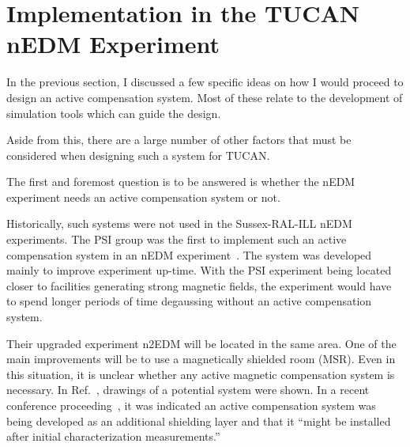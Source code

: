\section{Implementation in the TUCAN nEDM Experiment}\label{sec:implemantation}


In the previous section, I discussed a few specific ideas on how I would proceed to design an active compensation system. Most of these relate to the development of simulation tools which can guide the design.

Aside from this, there are a large number of other factors that must be considered when designing such a system for TUCAN.

The first and foremost question is to be answered is whether the nEDM experiment needs an active compensation system or not. 

Historically, such systems were not used in the Sussex-RAL-ILL nEDM experiments.
The PSI group was the first to implement such an active compensation system in an nEDM experiment~\cite{bea_paper}. The system was developed mainly to improve experiment up-time. With the PSI experiment being located closer to facilities generating strong magnetic fields, the experiment would have to spend longer periods of time degaussing without an active compensation system.

Their upgraded experiment n2EDM will be located in the same area. One of the main improvements will be to use a magnetically shielded room (MSR). Even in this situation, it is unclear whether any active magnetic compensation system is necessary.  %
In Ref.~\cite{rawlik}, drawings of a potential system were shown. In a recent conference proceeding~\cite{psi_n2edm_PPNS-workshop}, it was indicated an active compensation system was being developed as an additional shielding layer and that it ``might be installed after initial characterization measurements.'' 

